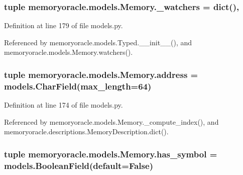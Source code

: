 \subsubsection[{\+\_\+watchers}]{\setlength{\rightskip}{0pt plus 5cm}tuple memoryoracle.\+models.\+Memory.\+\_\+watchers = dict()\hspace{0.3cm}{\ttfamily [static]}, {\ttfamily [private]}}\label{classmemoryoracle_1_1models_1_1Memory_ab3ca0e2d38804d9d8efa0afc41a87853}


Definition at line 179 of file models.\+py.



Referenced by memoryoracle.\+models.\+Typed.\+\_\+\+\_\+init\+\_\+\+\_\+(), and memoryoracle.\+models.\+Memory.\+watchers().

\hypertarget{classmemoryoracle_1_1models_1_1Memory_a0d6f1f526a6598c386604e83d37c7223}{}
\subsubsection[{address}]{\setlength{\rightskip}{0pt plus 5cm}tuple memoryoracle.\+models.\+Memory.\+address = models.\+Char\+Field(max\+\_\+length=64)\hspace{0.3cm}{\ttfamily [static]}}\label{classmemoryoracle_1_1models_1_1Memory_a0d6f1f526a6598c386604e83d37c7223}


Definition at line 174 of file models.\+py.



Referenced by memoryoracle.\+models.\+Memory.\+\_\+compute\+\_\+index(), and memoryoracle.\+descriptions.\+Memory\+Description.\+dict().

\hypertarget{classmemoryoracle_1_1models_1_1Memory_a20fbaa8285673be9bf3237c7b139ff28}{}
\subsubsection[{has\+\_\+symbol}]{\setlength{\rightskip}{0pt plus 5cm}tuple memoryoracle.\+models.\+Memory.\+has\+\_\+symbol = models.\+Boolean\+Field(default=False)\hspace{0.3cm}{\ttfamily [static]}}\label{classmemoryoracle_1_1models_1_1Memory_a20fbaa8285673be9bf3237c7b139ff28}


